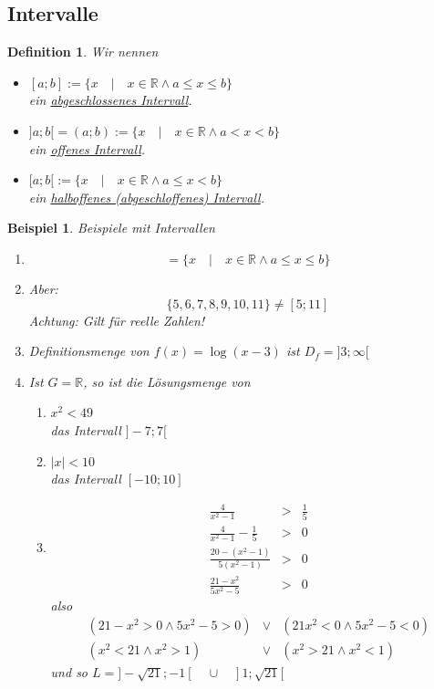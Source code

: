 \documentclass{report}
\newtheorem{mydef}{Definition}
\newtheorem{myexample}{Beispiel}
\begin{document}
\subsection{Intervalle}
\begin{mydef}Wir nennen\begin{itemize}
\item $[a;b] := \{x \quad | \quad x \in \mathbb{R} \land a \leq x \leq b\}$\\
ein \underline{abgeschlossenes Intervall}.
\item $]a;b[ = (a;b) := \{x \quad | \quad x \in \mathbb{R} \land a < x < b\}$\\
ein \underline{offenes Intervall}.
\item $[a;b[ := \{x \quad | \quad x \in \mathbb{R} \land a \leq x < b\}$\\
ein \underline{halboffenes (abgeschloffenes) Intervall}.\end{itemize}\end{mydef}
\begin{myexample}Beispiele mit Intervallen\begin{enumerate}\item \begin{equation}[5;11] = \{x \quad | \quad x \in \mathbb{R} \land a \leq x \leq b\}\end{equation}
\item Aber:\begin{equation}\{5, 6, 7, 8, 9, 10, 11\} \neq [5; 11]\end{equation}
Achtung: Gilt für reelle Zahlen!
\item Definitionsmenge von $f(x) = \log{(x-3)}$ ist $D_f = ]3; \infty [$
\item Ist $G = \mathbb{R}$, so ist die Lösungsmenge von
\begin{enumerate}\item $x^2 < 49$\\
das Intervall $]-7;7[$
\item $|x| < 10$\\
das Intervall $[-10;10]$
\item \begin{eqnarray}\frac{4}{x^2-1} & > & \frac{1}{5}\nonumber \\
\frac{4}{x^2-1}-\frac{1}{5} & > & 0\nonumber \\
\frac{20 - (x^2-1)}{5(x^2-1)} & > & 0\nonumber \\
\frac{21-x^2}{5x^2-5} & > & 0\end{eqnarray}
also
\begin{eqnarray}(21-x^2 > 0 \land 5x^2-5 > 0) & \lor & (21x^2 < 0 \land 5x^2-5<0)\nonumber \\
(x^2<21 \land x^2>1) & \lor & (x^2 > 21 \land x^2<1)\end{eqnarray}
und so $L = ]-\sqrt{21} ; -1[ \quad \cup \quad  ]1;\sqrt{21}[$\end{enumerate}
\end{enumerate}\end{myexample}
\end{document}
